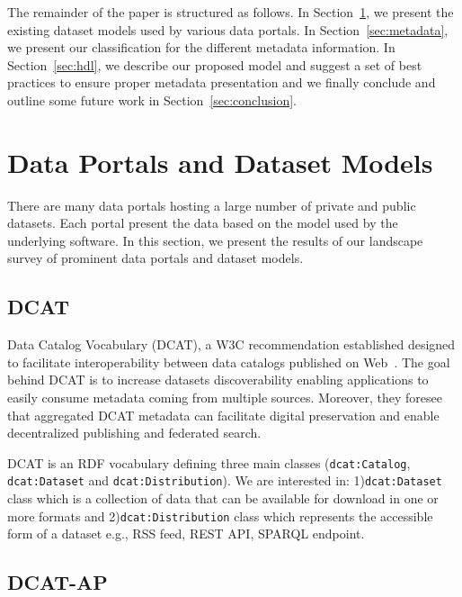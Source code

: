 \documentclass[runningheads,a4paper]{llncs}
\begin{document}
The remainder of the paper is structured as follows. In Section~\ref{sec:models}, we present the existing dataset models used by various data portals. In Section~\ref{sec:metadata}, we present our classification for the different metadata information. In Section~\ref{sec:hdl}, we describe our proposed model and suggest a set of best practices to ensure proper metadata presentation and we finally conclude and outline some future work in Section~\ref{sec:conclusion}.


\section{Data Portals and Dataset Models}
\label{sec:models}

There are many data portals hosting a large number of private and public datasets. Each portal present the data based on the model used by the underlying software. In this section, we present the results of our landscape survey of prominent data portals and dataset models.

\subsection{DCAT}

Data Catalog Vocabulary (DCAT), a W3C recommendation established designed to facilitate interoperability between data catalogs published on Web~\cite{Erickson:14:DCV}. The goal behind DCAT is to increase datasets discoverability enabling applications to easily consume metadata coming from multiple sources. Moreover, they foresee that aggregated DCAT metadata can facilitate digital preservation and enable decentralized publishing and federated search.

DCAT is an RDF vocabulary defining three main classes (\texttt{dcat:Catalog}, \texttt{dcat:Dataset} and \texttt{dcat:Distribution}). We are interested in: 1)\texttt{dcat:Dataset} class which is a collection of data that can be available for download in one or more formats and 2)\texttt{dcat:Distribution} class which represents the accessible form of a dataset e.g., RSS feed, REST API, SPARQL endpoint.

\subsection{DCAT-AP}
\end{document}
